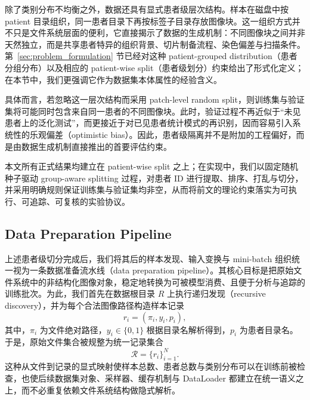 除了类别分布不均衡之外，数据还具有显式患者级层次结构。样本在磁盘中按 patient 目录组织，同一患者目录下再按标签子目录存放图像块。这一组织方式并不只是文件系统层面的便利，它直接揭示了数据的生成机制：不同图像块之间并非天然独立，而是共享患者特异的组织背景、切片制备流程、染色偏差与扫描条件。第~\ref{sec:problem_formulation} 节已经对这种 patient-grouped distribution（患者分组分布）以及相应的 patient-wise split（患者级划分）约束给出了形式化定义；在本节中，我们更强调它作为数据集本体属性的经验含义。

具体而言，若忽略这一层次结构而采用 patch-level random split，则训练集与验证集将可能同时包含来自同一患者的不同图像块。此时，验证过程不再近似于“未见患者上的泛化测试”，而更接近于对已见患者统计模式的再识别，因而容易引入系统性的乐观偏差（optimistic bias）。因此，患者级隔离并不是附加的工程偏好，而是由数据生成机制直接推出的首要评估约束。

本文所有正式结果均建立在 patient-wise split 之上；在实现中，我们以固定随机种子驱动 group-aware splitting 过程，对患者 ID 进行提取、排序、打乱与切分，并采用明确规则保证训练集与验证集均非空，从而将前文的理论约束落实为可执行、可追踪、可复核的实验协议。

\subsection{Data Preparation Pipeline}

上述患者级切分完成后，我们将其后的样本发现、输入变换与 mini-batch 组织统一视为一条数据准备流水线（data preparation pipeline）。其核心目标是把原始文件系统中的非结构化图像对象，稳定地转换为可被模型消费、且便于分析与追踪的训练批次。为此，我们首先在数据根目录 $R$ 上执行递归发现（recursive discovery），并为每个合法图像路径构造样本记录
\begin{equation}
    r_i = (\pi_i, y_i, p_i),
\end{equation}
其中，$\pi_i$ 为文件绝对路径，$y_i \in \{0,1\}$ 根据目录名解析得到，$p_i$ 为患者目录名。于是，原始文件集合被规整为统一记录集合
\begin{equation}
    \mathcal{R} = \{r_i\}_{i=1}^{N}.
\end{equation}
这种从文件到记录的显式映射使样本总数、患者总数与类别分布可以在训练前被检查，也使后续数据集对象、采样器、缓存机制与 DataLoader 都建立在统一语义之上，而不必重复依赖文件系统结构做隐式解析。

